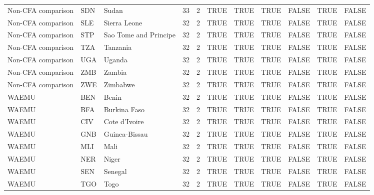 \begin{table}
\begin{tabular}[t]{lllrrllllll}
Non-CFA comparison & SDN & Sudan & 33 & 2 & TRUE & TRUE & TRUE & FALSE & TRUE & FALSE\\
Non-CFA comparison & SLE & Sierra Leone & 32 & 2 & TRUE & TRUE & TRUE & FALSE & TRUE & FALSE\\
Non-CFA comparison & STP & Sao Tome and Principe & 32 & 2 & TRUE & TRUE & TRUE & FALSE & TRUE & FALSE\\
\addlinespace
Non-CFA comparison & TZA & Tanzania & 32 & 2 & TRUE & TRUE & TRUE & FALSE & TRUE & FALSE\\
Non-CFA comparison & UGA & Uganda & 32 & 2 & TRUE & TRUE & TRUE & FALSE & TRUE & FALSE\\
Non-CFA comparison & ZMB & Zambia & 32 & 2 & TRUE & TRUE & TRUE & FALSE & TRUE & FALSE\\
Non-CFA comparison & ZWE & Zimbabwe & 32 & 2 & TRUE & TRUE & TRUE & FALSE & TRUE & FALSE\\
WAEMU & BEN & Benin & 32 & 2 & TRUE & TRUE & TRUE & FALSE & TRUE & FALSE\\
\addlinespace
WAEMU & BFA & Burkina Faso & 32 & 2 & TRUE & TRUE & TRUE & FALSE & TRUE & FALSE\\
WAEMU & CIV & Cote d'Ivoire & 32 & 2 & TRUE & TRUE & TRUE & FALSE & TRUE & FALSE\\
WAEMU & GNB & Guinea-Bissau & 32 & 2 & TRUE & TRUE & TRUE & FALSE & TRUE & FALSE\\
WAEMU & MLI & Mali & 32 & 2 & TRUE & TRUE & TRUE & FALSE & TRUE & FALSE\\
WAEMU & NER & Niger & 32 & 2 & TRUE & TRUE & TRUE & FALSE & TRUE & FALSE\\
\addlinespace
WAEMU & SEN & Senegal & 32 & 2 & TRUE & TRUE & TRUE & FALSE & TRUE & FALSE\\
WAEMU & TGO & Togo & 32 & 2 & TRUE & TRUE & TRUE & FALSE & TRUE & FALSE\\
\bottomrule
\end{tabular}
\end{table}